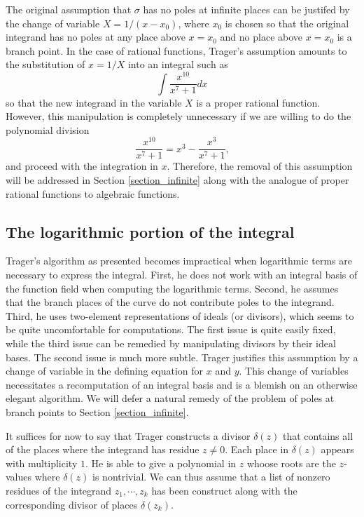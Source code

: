 \documentclass[12pt,reqno]{amsart}
\numberwithin{equation}{section}
\begin{document}
The original assumption that $\sigma$ has no poles at infinite places can be justifed by the change of variable $X = 1/(x-x_0)$, where $x_0$ is chosen so that the original integrand has no poles at any place above $x=x_0$ and no place above $x=x_0$ is a branch point. In the case of rational functions, Trager's assumption amounts to the substitution of $x=1/X$ into an integral such as
\begin{equation*}
 \int \frac{x^{10}}{x^7+1} dx
\end{equation*}
so that the new integrand in the variable $X$ is a proper rational function. However, this manipulation is completely unnecessary if we are willing to do the polynomial division
\begin{equation*}
\frac{x^{10}}{x^7+1} = x^3-\frac{x^3}{x^7+1}\text{,} 
\end{equation*}
and proceed with the integration in $x$. Therefore, the removal of this assumption will be addressed in Section \ref{section_infinite} along with the analogue of proper rational functions to algebraic functions.

\subsection{The logarithmic portion of the integral}
Trager's algorithm as presented becomes impractical when logarithmic terms are necessary to express the integral. First, he does not work with an integral basis of the function field when computing the logarithmic terms. Second, he assumes that the branch places of the curve do not contribute poles to the integrand. Third, he uses two-element representations of ideals (or divisors), which seems to be quite uncomfortable for computations. The first issue is quite easily fixed, while the third issue can be remedied by manipulating divisors by their ideal bases. The second issue is much more subtle. Trager justifies this assumption by a change of variable in the defining equation for $x$ and $y$. This change of variables necessitates a recomputation of an integral basis and is a blemish on an otherwise elegant algorithm. We will defer a natural remedy of the problem of poles at branch points to Section \ref{section_infinite}.

It suffices for now to say that Trager constructs a divisor $\delta(z)$ that contains all of the places where the integrand has residue $z \ne 0$. Each place in $\delta(z)$ appears with multiplicity $1$. He is able to give a polynomial in $z$ whoose roots are the $z$-values where $\delta(z)$ is nontrivial. We can thus assume that a list of nonzero residues of the integrand $z_1,\cdots,z_k$ has been construct along with the corresponding divisor of places $\delta(z_k)$.
\end{document}
